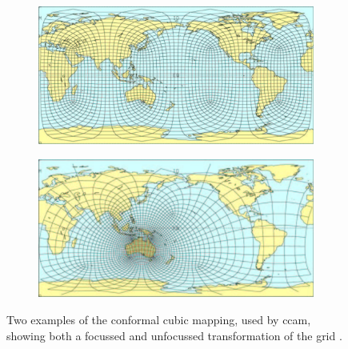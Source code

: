 		\begin{figure}[!htb]
	    	\centering	    

  			\begin{subfigure}[b]{0.8\textwidth}
  				\centering
	    		\includegraphics[width=\textwidth,natwidth=1752,natheight=878]{Fig/ccamnormal.png}
   				\caption{}
   				\label{fig:ccammapnorm} 
			\end{subfigure}

			\begin{subfigure}[b]{0.8\textwidth}
			\centering
	    		\includegraphics[width=\textwidth,natwidth=1790,natheight=898]{Fig/ccamfocussed.png}
				\caption{}
				\label{fig:ccammapfocus}
			\end{subfigure}

			\caption{Two examples of the conformal cubic mapping, used by \gls{ccam}, showing both a focussed and unfocussed transformation of the grid \citep{mcgregor:2005wz}.}
	    	\label{fig:ccammap}
		\end{figure}


